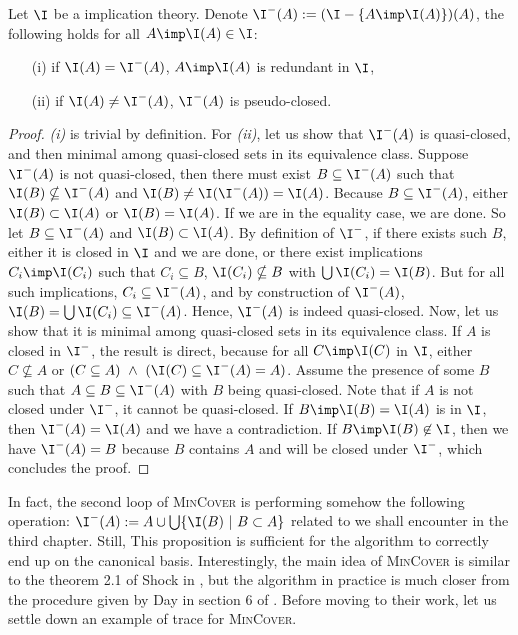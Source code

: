 \begin{proposition} Let $\I$ be a  implication theory. 
	Denote $\I^{-}(A) := (\I - \{ A \imp \I(A) \})(A)$, the following holds for 
	all $A \imp \I(A) \in \I$:
	\begin{itemize}
		\item[(i)] if $\I(A) = \I^{-}(A)$, $A \imp \I(A)$ is redundant in $\I$,
		\item[(ii)] if $\I(A) \neq \I^{-}(A)$, $\I^{-}(A)$ is pseudo-closed.
	\end{itemize}
	
\end{proposition}

\begin{proof} \textit{(i)} is trivial by definition. For \textit{(ii)}, let us
show that $\I^{-}(A)$ is quasi-closed, and then minimal among quasi-closed 
sets in its equivalence class. Suppose $\I^{-}(A)$ is not quasi-closed, then 
there must exist $B \subseteq \I^{-}(A)$ such that $\I(B) \nsubseteq \I^{-}(A)$ 
and $\I(B) \neq \I(\I^{-}(A)) = \I(A)$. Because $B \subseteq \I^{-}(A)$, either 
$\I(B) \subset \I(A)$ or $\I(B) = \I(A)$. If we are in the equality case, 
we are done. So let $B \subseteq \I^{-}(A)$ and $\I(B) \subset \I(A)$. By 
definition of $\I^{-}$, if there exists such $B$, either it is closed in 
$\I$ and we are done, or there exist implications $C_i \imp \I(C_i)$ such that 
$C_i \subseteq B$, $\I(C_i) \nsubseteq B$ with $\bigcup \I(C_i) = \I(B)$. But 
for all such implications, $C_i \subseteq \I^{-}(A)$, and by construction of 
$\I^{-}(A)$, $\I(B) = \bigcup \I(C_i) \subseteq \I^{-}(A)$. Hence, 
$\I^{-}(A)$ is indeed quasi-closed. Now, let us show that it is minimal among 
quasi-closed sets in its equivalence class. If $A$ is closed in $\I^{-}$, the 
result is direct, because for all $C \imp \I(C)$ in $\I$, either $C \nsubseteq 
A$ or $(C \subseteq A) \ \land \ (\I(C) \subseteq \I^{-}(A) = A)$. Assume the 
presence of some $B$ such that $A \subseteq B \subseteq \I^{-}(A)$ with $B$ 
being quasi-closed. Note that if $A$ is not closed under $\I^{-}$, it
cannot be quasi-closed. If $B \imp \I(B) = \I(A)$ is in $\I$, then 
$\I^{-}(A) = \I(A)$ and we have a contradiction. If $B \imp \I(B) \not\in \I$, 
then we have $\I^{-}(A) = B$ because $B$ contains $A$ and will be closed under 
$\I^{-}$, which concludes the proof.
\end{proof}

\vspace{1.2em}

In fact, the second loop of \textsc{MinCover} is performing somehow the following operation: $\I^{-}(A) := A \cup \bigcup \{\I(B) \ | \ B \subset A\}$
related to  we shall encounter in the third chapter.
Still, This proposition is sufficient for the algorithm to correctly end up on the canonical basis. Interestingly, the main idea of \textsc{MinCover} is similar to the theorem 2.1 of Shock in \cite{shock_computing_1986}, but the algorithm in practice is much closer from the procedure given by Day in section 6 of \cite{day_lattice_1992}. Before moving to their work, let us settle down an example of trace for \textsc{MinCover}.

